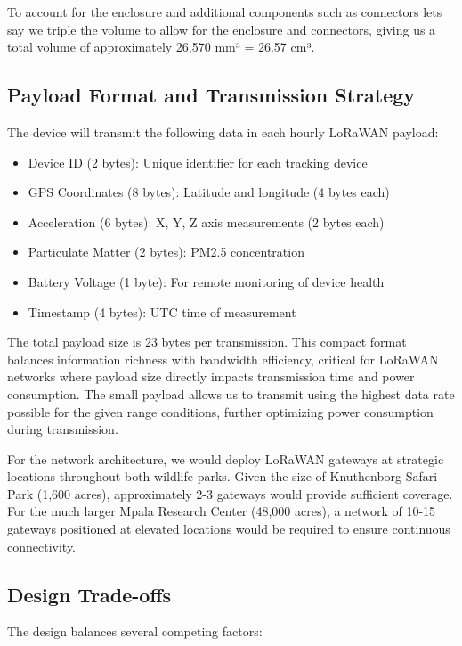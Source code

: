 To account for the enclosure and additional components such as connectors lets say we triple the volume to allow for the enclosure and connectors, giving us a total volume of approximately 26,570 mm³ = 26.57 cm³.

\subsection{Payload Format and Transmission Strategy}
The device will transmit the following data in each hourly LoRaWAN payload:

\begin{itemize}
  \item Device ID (2 bytes): Unique identifier for each tracking device
  \item GPS Coordinates (8 bytes): Latitude and longitude (4 bytes each)
  \item Acceleration (6 bytes): X, Y, Z axis measurements (2 bytes each)
  \item Particulate Matter (2 bytes): PM2.5 concentration
  \item Battery Voltage (1 byte): For remote monitoring of device health
  \item Timestamp (4 bytes): UTC time of measurement
\end{itemize}

The total payload size is 23 bytes per transmission. This compact format balances information richness with bandwidth efficiency, critical for LoRaWAN networks where payload size directly impacts transmission time and power consumption. The small payload allows us to transmit using the highest data rate possible for the given range conditions, further optimizing power consumption during transmission.

For the network architecture, we would deploy LoRaWAN gateways at strategic locations throughout both wildlife parks. Given the size of Knuthenborg Safari Park (1,600 acres), approximately 2-3 gateways would provide sufficient coverage. For the much larger Mpala Research Center (48,000 acres), a network of 10-15 gateways positioned at elevated locations would be required to ensure continuous connectivity.

\subsection{Design Trade-offs}
The design balances several competing factors:

